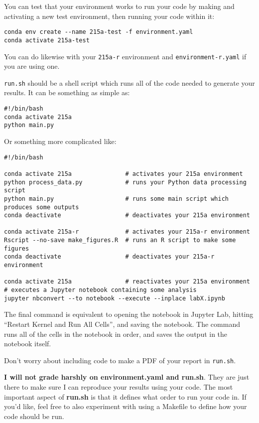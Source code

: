 \documentclass[letterpaper,12pt]{article}
\begin{document}
You can test that your environment works to run your code by making and activating a new test environment, then running your code within it:
\begin{verbatim}
conda env create --name 215a-test -f environment.yaml
conda activate 215a-test
\end{verbatim}
You can do likewise with your \texttt{215a-r} environment and \texttt{environment-r.yaml} if you are using one.

\texttt{run.sh} should be a shell script which runs all of the code needed to generate your results. It can be something as simple as:

\begin{verbatim}
#!/bin/bash
conda activate 215a
python main.py
\end{verbatim}
Or something more complicated like:
\begin{verbatim}
#!/bin/bash

conda activate 215a               # activates your 215a environment
python process_data.py            # runs your Python data processing script
python main.py                    # runs some main script which produces some outputs
conda deactivate                  # deactivates your 215a environment

conda activate 215a-r             # activates your 215a-r environment
Rscript --no-save make_figures.R  # runs an R script to make some figures
conda deactivate                  # deactivates your 215a-r environment

conda activate 215a               # reactivates your 215a environment
# executes a Jupyter notebook containing some analysis
jupyter nbconvert --to notebook --execute --inplace labX.ipynb
\end{verbatim}
The final command is equivalent to opening the notebook in Jupyter Lab, hitting ``Restart Kernel and Run All Cells'', and saving the notebook. The command runs all of the cells in the notebook in order, and saves the output in the notebook itself.

Don't worry about including code to make a PDF of your report in \texttt{run.sh}.

\textbf{I will not grade harshly on environment.yaml and run.sh}. They are just there to make sure I can reproduce your results using your code. The most important aspect of \textbf{run.sh} is that it defines what order to run your code in. If you'd like, feel free to also experiment with using a Makefile to define how your code should be run.

\iffalse This will be done by using the following commands:
\begin{verbatim}
git clone https://github.com/USERNAME/stat-215-a.git
cd stat-215-a/labs/labX
if [ -f code/environment.yaml ]; then
    conda env create -f code/environment.yaml
else
    echo "environment.yaml not found!"
fi
if [ -f code/environment-r.yaml ]; then
    conda env create -f code/environment-r.yaml
fi
cd code
bash run.sh
cd ..
if [ ! -f report/labX.pdf ]; then
    echo "report/labX.pdf not found!"
fi
\end{verbatim}
\fi
\end{document}

